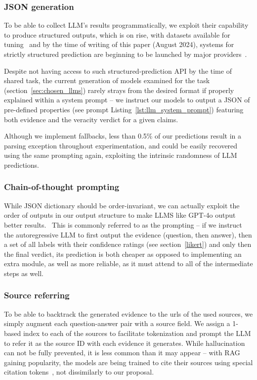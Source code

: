 \subsubsection{JSON generation}

To be able to collect LLM's results programmatically, we exploit their capability to produce structured outputs, which is on rise, with datasets available for tuning~\cite{tang2024strucbenchlargelanguagemodels} and by the time of writing of this paper (August 2024), systems for strictly structured prediction are beginning to be launched by major providers~\cite{json}.

Despite not having access to such structured-prediction API by the time of \averitec{} shared task, the current generation of models examined for the task (section~\ref{sec:chosen_llms}) rarely strays from the desired format if properly explained within a system prompt -- we instruct our models to output a JSON of pre-defined properties (see prompt Listing~\ref{lst:llm_system_prompt}) featuring both evidence and the veracity verdict for a given claims.

Although we implement fallbacks, less than 0.5\% of our predictions result in a parsing exception throughout experimentation, and could be easily recovered using the same prompting again, exploiting the intrinsic randomness of LLM predictions.

\subsubsection{Chain-of-thought prompting}
While JSON dictionary should be order-invariant, we can actually exploit the order of outputs in our output structure to make LLMS like GPT-4o output better results.~\cite{cot}
This is commonly referred to as the  prompting -- if we instruct the autoregressive LLM to first output the evidence (question, then answer), then a set of all labels with their confidence ratings (see section~\ref{likert}) and only then the final verdict, its prediction is both cheaper as opposed to implementing an extra module, as well as more reliable, as it must attend to all of the intermediate steps as well.

\subsubsection{Source referring}
To be able to backtrack the generated evidence to the urls of the used sources, we simply augment each question-answer pair with a source field.
We assign a 1-based index to each of the sources to facilitate tokenization and prompt the LLM to refer it as the source ID with each evidence it generates.
While hallucination can not be fully prevented, it is less common than it may appear -- with RAG gaining popularity, the models are being trained to cite their sources using special citation tokens~\cite{menick2022teachinglanguagemodelssupport}, not dissimilarly to our proposal.

